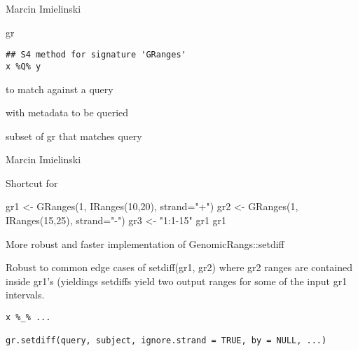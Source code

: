 \documentclass[a4paper]{book}
\begin{document}
%
\begin{Author}\relax
Marcin Imielinski
\end{Author}
%
\begin{Description}\relax
gr 
\end{Description}
%
\begin{Usage}
\begin{verbatim}
## S4 method for signature 'GRanges'
x %Q% y
\end{verbatim}
\end{Usage}
%
\begin{Arguments}
\begin{ldescription}
\item[\code{x}]  to match against a query 

\item[\code{y}]  with metadata to be queried
\end{ldescription}
\end{Arguments}
%
\begin{Value}
subset of gr that matches query
\end{Value}
%
\begin{Author}\relax
Marcin Imielinski
\end{Author}
%
\begin{Description}\relax
Shortcut for 

gr1 <- GRanges(1, IRanges(10,20), strand="+")
gr2 <- GRanges(1, IRanges(15,25), strand="-")
gr3 <- "1:1-15"
gr1 
gr1 

More robust and faster implementation of GenomicRangs::setdiff

Robust to common edge cases of setdiff(gr1, gr2)  where gr2 ranges are contained inside gr1's (yieldings
setdiffs yield two output ranges for some of the input gr1 intervals.
\end{Description}
%
\begin{Usage}
\begin{verbatim}
x %_% ...

gr.setdiff(query, subject, ignore.strand = TRUE, by = NULL, ...)
\end{verbatim}
\end{Usage}
\end{document}
